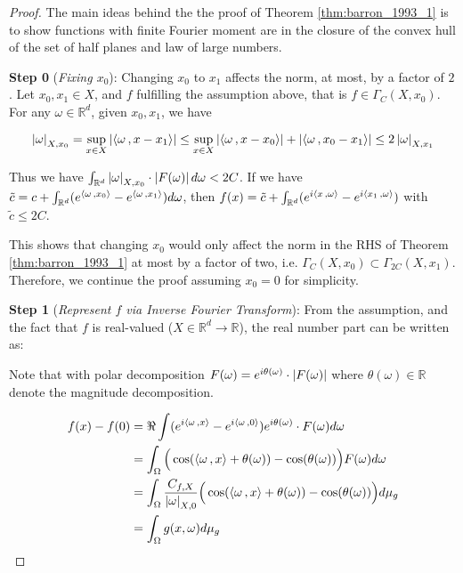 \begin{proof}

    The main ideas behind the the proof of Theorem \ref{thm:barron_1993_1} is to
    show functions with finite Fourier moment are in the closure of the convex
    hull of the set of half planes and law of large numbers.

    \textbf{Step 0} (\textit{Fixing $x_0$}): Changing $x_0$ to $x_1$ affects the
    norm, at most, by a factor of $2$. Let $x_0, x_1 \in X$, and $f$ fulfilling
    the assumption above, that is $f \in \Gamma_C(X, x_0)$. For any $\omega \in
        \mathbb{R}^d$, given $x_0, x_1$, we have

    \begin{equation}
        \left| \omega \right|_{X, x_0} = \sup_{x\in X}\left| \left\langle \omega\, , x-x_1 \right\rangle \right| \leq \sup_{x\in X}\left| \left\langle \omega\, , x-x_0 \right\rangle \right| + \left| \left\langle \omega\, , x_0-x_1 \right\rangle \right| \leq 2\left| \omega \right|_{X, x_1}
    \end{equation}

    Thus we have $\int_{\mathbb{R}^d} \left| \omega \right|_{X, x_0} \cdot
        \left| F(\omega) \right| d\omega < 2C$. If we have $\tilde{c} = c +
        \int_{\mathbb{R}^d} (e^{\left\langle \omega\, , x_0 \right\rangle} - e^{\left\langle \omega\, , x_1 \right\rangle})
        d\omega$, then $f(x) = \tilde{c} + \int_{\mathbb{R}^d} (e^{i\left\langle x\, , \omega \right\rangle}
        - e^{i\left\langle x_1\, , \omega \right\rangle})$ with $\tilde{c} \leq 2C$.

    This shows that changing $x_0$ would only affect the norm in the RHS of
    Theorem \ref{thm:barron_1993_1} at most by a factor of two, i.e.
    $\Gamma_C(X, x_0) \subset \Gamma_{2C}(X, x_1)$. Therefore, we continue the
    proof assuming $x_0 = 0$ for simplicity.

    \textbf{Step 1} (\textit{Represent $f$ via Inverse Fourier Transform}): From
    the assumption, and the fact that $f$ is real-valued ($X \in \mathbb{R}^d
        \to \mathbb{R}$), the real number part can be written as:

    Note that with polar decomposition $F(\omega) = e^{i\theta(\omega)} \cdot
        \left| F(\omega) \right|$ where $\theta(\omega) \in \mathbb{R}$ denote the magnitude
    decomposition.

    \begin{align}
        f(x) - f(0)
         & = \Re \int (e^{i\left\langle \omega\, , x \right\rangle} - e^{i\left\langle \omega\, , 0 \right\rangle}) e^{i\theta(\omega)} \cdot F(\omega) d\omega                              \\
         & = \int_{\Omega}\Big(\cos(\left\langle \omega\, , x \right\rangle + \theta(\omega)) - \cos(\theta(\omega))\Big)
        F(\omega) d\omega                                                                                                                    \\
         & = \int_{\Omega} \frac{C_{f,X}}{\left| \omega \right|_{X, 0}}\Big(\cos(\left\langle \omega\, , x \right\rangle + \theta(\omega)) - \cos(\theta(\omega))\Big) d\mu_g \\
         & = \int_{\Omega} g(x, \omega) d\mu_g \label{eq:barron_fouier_int}
    \end{align}


\end{proof}
